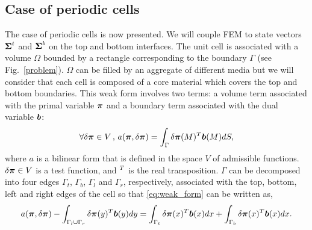 \subsection{Case of periodic cells\label{sec:periodic_layers}}
The case of periodic cells is now presented. We will couple FEM to state vectors $\boldsymbol{\Sigma}^t$ and $\boldsymbol{\Sigma}^b$ on the top and bottom interfaces. The unit cell is associated with a volume $\Omega$ bounded by a rectangle corresponding to the boundary $\Gamma$ (see Fig.~\ref{problem}). $\Omega$ can be filled by an aggregate of different media but we will consider that each cell is composed of a core material which covers the top and bottom boundaries. This weak form involves two terms: a volume term associated with the primal variable $\boldsymbol{\pi}$ and a boundary term associated with the dual variable $\boldsymbol{b}$:
\begin{equation}\label{eq:weak_form}
\forall \delta\boldsymbol{\pi} \in V \, , \,  a(\boldsymbol{\pi},\delta\boldsymbol{\pi})=\int_{\Gamma} 
 \delta\boldsymbol{\pi}(M)^T \boldsymbol{b}(M)  dS,
\end{equation}
where $a$ is a bilinear form that is defined in the space $V$ of admissible functions. $\delta\boldsymbol{\pi}\in V$ is a test function, and $^T$ is the real transposition.  $\Gamma$ can be decomposed into four edges $\Gamma_t$, $\Gamma_b$, $\Gamma_l$ and $\Gamma_r$, respectively, associated with the top, bottom, left and right edges of the cell so that \cref{eq:weak_form} can be written as,
\begin{equation}\label{eq:weak_form_decomposed}
  a(\boldsymbol{\pi},\delta\boldsymbol{\pi})-\int_{\Gamma_l\cup \Gamma_r} 
\delta\boldsymbol{\pi}(y)^T \boldsymbol{b}(y)  dy
=\int_{\Gamma_t} 
\delta\boldsymbol{\pi}(x)^T \boldsymbol{b}(x)  dx 
 +\int_{\Gamma_b} 
\delta\boldsymbol{\pi}(x)^T \boldsymbol{b}(x)  dx .
\end{equation}



